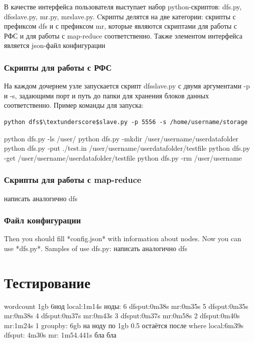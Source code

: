 \documentclass[12pt,a4paper,oneside]{extarticle}
\begin{document}
        В качестве интерфейса пользователя выступает набор python-скриптов: dfs.py, dfs\textunderscore slave.py, mr.py, mr\textunderscore slave.py.
        Cкрипты делятся на две категории: скрипты с префиксом dfs и с префиксом mr, которые являются скриптами для работы с РФС и для работы с map-reduce соответственно.
        Также элементом интерфейса является json-файл конфигурации

        \subsubsection{Скрипты для работы с РФС}
            На каждом дочернем узле запускается скрипт dfs\textunderscore slave.py с двумя аргументами -p и -s, задающими порт и путь до папки для хранения блоков данных соответственно.
            Пример команды для запуска:
            \lstset{}
            \begin{lstlisting}[mathescape] 
    python dfs$\textunderscore$slave.py -p 5556 -s /home/username/storage
            \end{lstlisting}
            


                


            


                python dfs.py -ls /user/
                python dfs.py -mkdir /user/username/userdatafolder
                python dfs.py -put ./test.in /user/username/userdatafolder/testfile
                python dfs.py -get /user/username/userdatafolder/testfile
                python dfs.py -rm /user/username
        \subsubsection{Скрипты для работы с map-reduce}
            написать аналогично dfs

        \subsubsection{Файл конфигурации}
        Then you should fill *config.json* with information about nodes. Now you can use *dfs.py*. Samples of use dfs.py:
            написать аналогично dfs
    \clearpage  


\clearpage

\section{Тестирование}
\label{sec:tests}
    wordcount
	1gb 6нод
        local:1m14s
        ноды:
        6
		dfsput:0m38s
		mr:0m35s
	5
		dfsput:0m35s
		mr:0m38s
	4
		dfsput:0m37s
		mr:0m43s
	3
		dfsput:0m37s
		mr:0m58s
	2
		dfsput:0m40s
		mr:1m24s
	1
    groupby:
	6gb
	на ноду по 1gb
	0.5 остаётся после where
        local:6m39s
        dfsput: 4m30s
        mr: 1m54.441s
    бла бла
        
\end{document}
